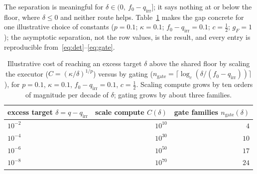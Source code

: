 \documentclass[11pt]{article}
\theoremstyle{definition}
\theoremstyle{remark}
\newcommand{\fesc}{f}
\begin{document}
The separation is meaningful for $\delta\in(0,\ \fesc_0-q_{\mathrm{irr}}]$; it says nothing at or below
the floor, where $\delta\le0$ and neither route helps. Table~\ref{tab:sep} makes the gap concrete for
one illustrative choice of constants ($p=0.1$; $\kappa=0.1$; $\fesc_0-q_{\mathrm{irr}}=0.1$;
$c=\tfrac12$; $g_F=1$);
the asymptotic separation, not the row values, is the result, and every entry is reproducible
from~\eqref{eq:det}--\eqref{eq:gate}.

\begin{table}[h]
\centering
\small
\begin{tabular}{lrr}
\toprule
excess target $\delta=q-q_{\mathrm{irr}}$ & scale compute $C(\delta)$ & gate families $n_{\mathrm{gate}}(\delta)$ \\
\midrule
$10^{-2}$ & $10^{10}$ & $4$ \\
$10^{-4}$ & $10^{30}$ & $10$ \\
$10^{-6}$ & $10^{50}$ & $17$ \\
$10^{-8}$ & $10^{70}$ & $24$ \\
\bottomrule
\end{tabular}
\caption{Illustrative cost of reaching an excess target $\delta$ above the shared floor by scaling the
executor ($C=(\kappa/\delta)^{1/p}$) versus by gating
($n_{\mathrm{gate}}=\lceil\log_c(\delta/(\fesc_0-q_{\mathrm{irr}}))\rceil$), for $p=0.1$, $\kappa=0.1$,
$\fesc_0-q_{\mathrm{irr}}=0.1$, $c=\tfrac12$. Scaling compute grows by ten orders of magnitude per decade of
$\delta$; gating grows by about three families.}\label{tab:sep}
\end{table}
\end{document}

